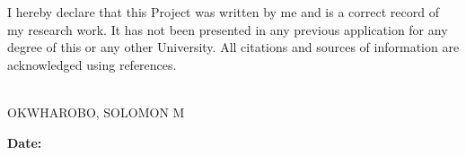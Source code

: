 \vspace{1cm}

\noindent
I hereby declare that this Project was written by me and is a correct record of my research work. It has not been presented in any previous application for any degree of this or any other University. All citations and sources of information are acknowledged using references.

\vfill

\noindent
\makebox[3in]{\hrulefill} \\
OKWHAROBO, SOLOMON M \\

\vspace{1cm}

\noindent
\textbf{Date:} \makebox[2in]{\hrulefill}